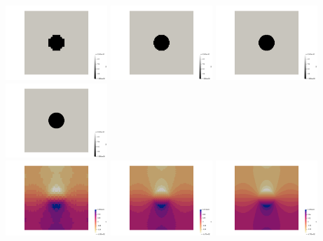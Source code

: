 \begin{center}
\includegraphics[width=3.84cm]{python_codes/fieldstone_78/results/sphere/by16}
\includegraphics[width=3.84cm]{python_codes/fieldstone_78/results/sphere/by32}
\includegraphics[width=3.84cm]{python_codes/fieldstone_78/results/sphere/by64}
\includegraphics[width=3.84cm]{python_codes/fieldstone_78/results/sphere/by128}\\
\includegraphics[width=3.84cm]{python_codes/fieldstone_78/results/sphere/p16}
\includegraphics[width=3.84cm]{python_codes/fieldstone_78/results/sphere/p32}
\includegraphics[width=3.84cm]{python_codes/fieldstone_78/results/sphere/p64}

\end{center}
